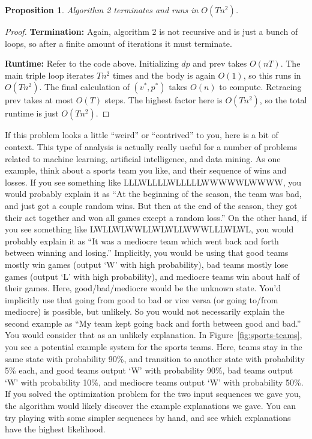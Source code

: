 \documentclass[10pt]{article}
\newtheorem{proposition}[lemma]{Proposition}
\begin{document}
\begin{proposition}
  Algorithm 2 terminates and runs in \(O(Tn^2)\).
\end{proposition}

\begin{proof}
  \textbf{Termination:} Again, algorithm 2 is not recursive and is just a bunch of loops, so after a finite amount of iterations it must terminate.

  \textbf{Runtime:} Refer to the code above. Initializing \(dp\) and prev takes \(O(nT)\). The main triple loop iterates \(Tn^2\) times and the body is again \(O(1)\), so this runs in \(O(Tn^2)\). The final calculation of \((v^*, p^*)\) takes \(O(n)\) to compute. Retracing prev takes at most \(O(T)\) steps. The highest factor here is \(O(Tn^2)\), so the total runtime is just \(O(Tn^2)\).
\end{proof}

  \medskip

  If this problem looks a little ``weird'' or ``contrived'' to you, here is a bit of context. This type of analysis is actually really useful for a number of problems related to machine learning, artificial intelligence, and data mining. As one example, think about a sports team you like, and their sequence of wins and losses. If you see something like LLLWLLLLWLLLLLWWWWWLWWWW, you would probably explain it as ``At the beginning of the season, the team was bad, and just got a couple random wins. But then at the end of the season, they got their act together and won all games except a random loss.'' On the other hand, if you see something like LWLLWLWWLLWLWLLWWWLLLWLWL, you would probably explain it as ``It was a mediocre team which went back and forth between winning and losing.''
  Implicitly, you would be using that good teams mostly win games (output `W' with high probability), bad teams mostly lose games (output `L' with high probability), and mediocre teams win about half of their games. Here, good/bad/mediocre would be the unknown state. You'd implicitly use that going from good to bad or vice versa (or going to/from mediocre) is possible, but unlikely. So you would not necessarily explain the second example as ``My team kept going back and forth between good and bad.'' You would consider that as an unlikely explanation.
In Figure~\ref{fig:sports-teams}, you see a potential example system for the sports teams. Here, teams stay in the same state with probability 90\%, and transition to another state with probability 5\% each, and good teams output `W' with probability 90\%, bad teams output `W' with probability 10\%, and mediocre teams output `W' with probability 50\%. If you solved the optimization problem for the two input sequences we gave you, the algorithm would likely discover the example explanations we gave. You can try playing with some simpler sequences by hand, and see which explanations have the highest likelihood.
\end{document}
